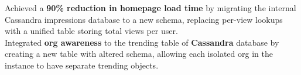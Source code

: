 \documentclass[]{Nikhil_Kadiyan_Resume}
\begin{document}
\pt Achieved a \textbf{90\% reduction in homepage load time} by migrating the internal Cassandra impressions database to a new schema, replacing per-view lookups with a unified table storing total views per user.\\
\pt Integrated \textbf{org awareness} to the trending table of \textbf{Cassandra} database by creating a new table with altered schema, allowing each isolated org in the instance to have separate trending objects.\\
\end{document}
